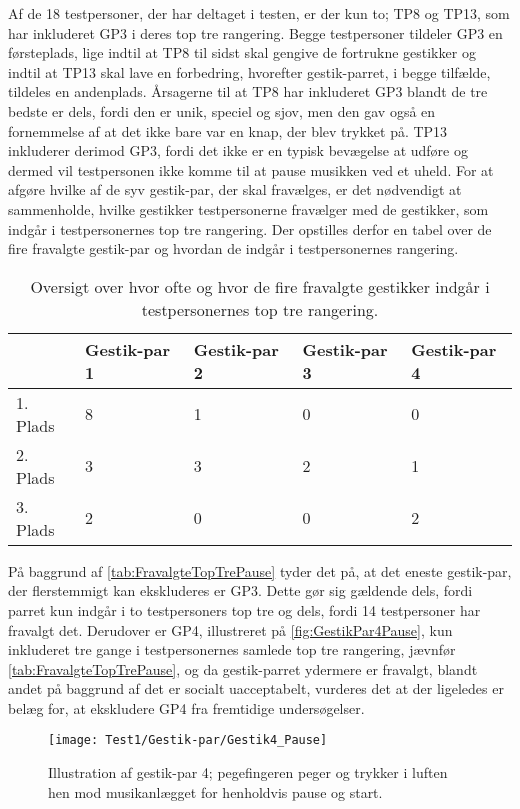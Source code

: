 Af de 18 testpersoner, der har deltaget i testen, er der kun to; TP8 og TP13, som har inkluderet GP3 i deres top tre rangering. Begge testpersoner tildeler GP3 en førsteplads, lige indtil at TP8 til sidst skal gengive de fortrukne gestikker og indtil at TP13 skal lave en forbedring, hvorefter gestik-parret, i begge tilfælde, tildeles en andenplads. Årsagerne til at TP8 har inkluderet GP3 blandt de tre bedste er dels, fordi den er unik, speciel og sjov, men den gav også en fornemmelse af at det ikke bare var en knap, der blev trykket på. TP13 inkluderer derimod GP3, fordi det ikke er en typisk bevægelse at udføre og dermed vil testpersonen ikke komme til at pause musikken ved et uheld.\blankline
%
For at afgøre hvilke af de syv gestik-par, der skal fravælges, er det nødvendigt at sammenholde, hvilke gestikker testpersonerne fravælger med de gestikker, som indgår i testpersonernes top tre rangering. Der opstilles derfor en tabel over de fire fravalgte gestik-par og hvordan de indgår i testpersonernes rangering.
%
\begin{table}[H]
	\centering
	\begin{tabular}{ | p{2.4cm} | p{2.4cm} | p{2.4cm} | p{2.4cm} | p{2.4cm} |}
	\hline
		 & Gestik-par 1 & Gestik-par 2 & Gestik-par 3 & Gestik-par 4 \\ \hline
		1. Plads & 8 & 1 & 0 & 0\\ \hline
		2. Plads & 3 & 3 & 2 & 1\\ \hline
		3. Plads & 2 & 0 & 0 & 2\\ \hline
	\end{tabular}
	\caption{Oversigt over hvor ofte og hvor de fire fravalgte gestikker indgår i testpersonernes top tre rangering.}
	\label{tab:FravalgteTopTrePause}
\end{table}
\noindent
%
På baggrund af \autoref{tab:FravalgteTopTrePause} tyder det på, at det eneste gestik-par, der flerstemmigt kan ekskluderes er GP3. Dette gør sig gældende dels, fordi parret kun indgår i to testpersoners top tre og dels, fordi 14 testpersoner har fravalgt det. Derudover er GP4, illustreret på \autoref{fig:GestikPar4Pause}, kun inkluderet tre gange i testpersonernes samlede top tre rangering, jævnfør \autoref{tab:FravalgteTopTrePause}, og da gestik-parret ydermere er fravalgt, blandt andet på baggrund af det er socialt uacceptabelt, vurderes det at der ligeledes er belæg for, at ekskludere GP4 fra fremtidige undersøgelser.  
%
\begin{figure}[H]
	\centering
	\texttt{[image: Test1/Gestik-par/Gestik4\_Pause]}
	\caption{Illustration af gestik-par 4; pegefingeren peger og trykker i luften hen mod musikanlægget for henholdvis pause og start.}
	\label{fig:GestikPar4Pause}
\end{figure}
